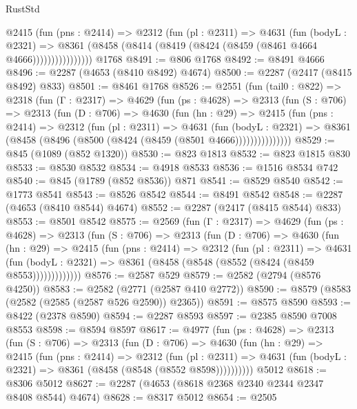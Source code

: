\begin{lexlean}{RustStd}
\begin{coremodule}
                @2415
                  (fun (pns : @2414) =>
                  @2312
                    (fun (pl : @2311) =>
                    @4631
                      (fun (bodyL : @2321) =>
                      @8361 (@8458 (@8414 (@8419 (@8424 (@8459 (@8461 @4664 @4666))))))))))))))))
    @1768
@8491 := @806 @1768
@8492 := @8491 @4666
@8496 := @2287 (@4653 (@8410 @8492) @4674)
@8500 := @2287 (@2417 (@8415 @8492) @833)
@8501 := @8461 @1768
@8526 := @2551
    (fun (tail0 : @822) =>
    @2318
      (fun (Γ : @2317) =>
      @4629
        (fun (ps : @4628) =>
        @2313
          (fun (S : @706) =>
          @2313
            (fun (D : @706) =>
            @4630
              (fun (hn : @29) =>
              @2415
                (fun (pns : @2414) =>
                @2312
                  (fun (pl : @2311) =>
                  @4631
                    (fun (bodyL : @2321) =>
                    @8361 (@8458 (@8496 (@8500 (@8424 (@8459 (@8501 @4666)))))))))))))))
@8529 := @845 (@1089 (@852 @1320))
@8530 := @823 @1813
@8532 := @823 @1815 @830
@8533 := @8530 @8532
@8534 := @4918 @8533
@8536 := @1516 @8534 @742
@8540 := @845 (@1789 (@852 @8536)) @871
@8541 := @8529 @8540
@8542 := @1773 @8541
@8543 := @8526 @8542
@8544 := @8491 @8542
@8548 := @2287 (@4653 (@8410 @8544) @4674)
@8552 := @2287 (@2417 (@8415 @8544) @833)
@8553 := @8501 @8542
@8575 := @2569
    (fun (Γ : @2317) =>
    @4629
      (fun (ps : @4628) =>
      @2313
        (fun (S : @706) =>
        @2313
          (fun (D : @706) =>
          @4630
            (fun (hn : @29) =>
            @2415
              (fun (pns : @2414) =>
              @2312
                (fun (pl : @2311) =>
                @4631
                  (fun (bodyL : @2321) =>
                  @8361 (@8458 (@8548 (@8552 (@8424 (@8459 @8553)))))))))))))
@8576 := @2587 @529
@8579 := @2582 (@2794 (@8576 @4250))
@8583 := @2582 (@2771 (@2587 @410 @2772))
@8590 := @8579 (@8583 (@2582 (@2585 (@2587 @526 @2590)) @2365))
@8591 := @8575 @8590
@8593 := @8422 (@2378 @8590)
@8594 := @2287 @8593
@8597 := @2385 @8590 @7008 @8553
@8598 := @8594 @8597
@8617 := @4977
    (fun (ps : @4628) =>
    @2313
      (fun (S : @706) =>
      @2313
        (fun (D : @706) =>
        @4630
          (fun (hn : @29) =>
          @2415
            (fun (pns : @2414) =>
            @2312
              (fun (pl : @2311) =>
              @4631 (fun (bodyL : @2321) => @8361 (@8458 (@8548 (@8552 @8598))))))))))
    @5012
@8618 := @8306 @5012
@8627 := @2287 (@4653 (@8618 @2368 @2340 @2344 @2347 @8408 @8544) @4674)
@8628 := @8317 @5012
@8654 := @2505

\end{coremodule}
\end{lexlean}
